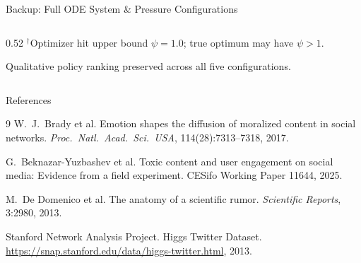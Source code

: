 \documentclass[aspectratio=169,11pt]{beamer}
\begin{document}
\begin{frame}{Backup: Full ODE System \& Pressure Configurations}
\begin{columns}[T]
\begin{column}{0.52\textwidth}
      \vspace{0.3em}
      \scriptsize $^\dagger$Optimizer hit upper bound $\psi{=}1.0$; true optimum may have $\psi{>}1$.

      \vspace{0.2em}
      \small Qualitative policy ranking preserved across all five configurations.
    \end{column}
  \end{columns}
\end{frame}

\begin{frame}[allowframebreaks]{References}
  \scriptsize
  \begin{thebibliography}{9}
    W.~J.~Brady et al.
    Emotion shapes the diffusion of moralized content in social networks.
    \textit{Proc.\ Natl.\ Acad.\ Sci.\ USA}, 114(28):7313--7318, 2017.

    G.~Beknazar-Yuzbashev et al.
    Toxic content and user engagement on social media: Evidence from a field experiment.
    CESifo Working Paper 11644, 2025.

    M.~De Domenico et al.
    The anatomy of a scientific rumor.
    \textit{Scientific Reports}, 3:2980, 2013.

    Stanford Network Analysis Project.
    Higgs Twitter Dataset.
    \url{https://snap.stanford.edu/data/higgs-twitter.html}, 2013.
  \end{thebibliography}
\end{frame}
\end{document}
